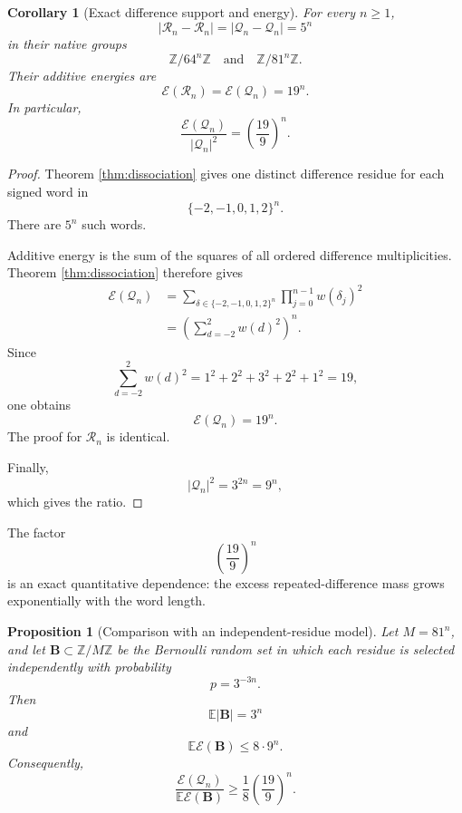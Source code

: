 \documentclass[11pt]{article}
\newtheorem{proposition}[theorem]{Proposition}
\newtheorem{corollary}[theorem]{Corollary}
\theoremstyle{remark}
\newcommand{\Z}{\mathbb{Z}}
\newcommand{\Rset}{\mathcal{R}}
\newcommand{\Qset}{\mathcal{Q}}
\newcommand{\Ecal}{\mathcal{E}}
\begin{document}
\begin{corollary}[Exact difference support and energy]
\label{cor:energy}
For every \(n\ge1\),
\[
|\Rset_n-\Rset_n|=|\Qset_n-\Qset_n|=5^n
\]
in their native groups
\[
\Z/64^n\Z
\quad\text{and}\quad
\Z/81^n\Z.
\]
Their additive energies are
\[
\Ecal(\Rset_n)=\Ecal(\Qset_n)=19^n.
\]
In particular,
\[
\frac{\Ecal(\Qset_n)}{|\Qset_n|^2}
=
\left(\frac{19}{9}\right)^n.
\]
\end{corollary}

\begin{proof}
Theorem \ref{thm:dissociation} gives one distinct difference residue for each signed word in
\[
\{-2,-1,0,1,2\}^n.
\]
There are \(5^n\) such words.

Additive energy is the sum of the squares of all ordered difference multiplicities.  Theorem \ref{thm:dissociation} therefore gives
\begin{align*}
\Ecal(\Qset_n)
&=
\sum_{\delta\in\{-2,-1,0,1,2\}^n}
\prod_{j=0}^{n-1}w(\delta_j)^2\\
&=
\left(
\sum_{d=-2}^{2}w(d)^2
\right)^n.
\end{align*}
Since
\[
\sum_{d=-2}^{2}w(d)^2
=
1^2+2^2+3^2+2^2+1^2
=
19,
\]
one obtains
\[
\Ecal(\Qset_n)=19^n.
\]
The proof for \(\Rset_n\) is identical.

Finally,
\[
|\Qset_n|^2=3^{2n}=9^n,
\]
which gives the ratio.
\end{proof}

The factor
\[
\left(\frac{19}{9}\right)^n
\]
is an exact quantitative dependence: the excess repeated-difference mass grows exponentially with the word length.

\begin{proposition}[Comparison with an independent-residue model]
\label{prop:bernoulli}
Let \(M=81^n\), and let \(\mathbf B\subset\Z/M\Z\) be the Bernoulli random set in which each residue is selected independently with probability
\[
p=3^{-3n}.
\]
Then
\[
\mathbb E|\mathbf B|=3^n
\]
and
\[
\mathbb E\Ecal(\mathbf B)\le8\cdot9^n.
\]
Consequently,
\[
\frac{\Ecal(\Qset_n)}
{\mathbb E\Ecal(\mathbf B)}
\ge
\frac18\left(\frac{19}{9}\right)^n.
\]
\end{proposition}
\end{document}
